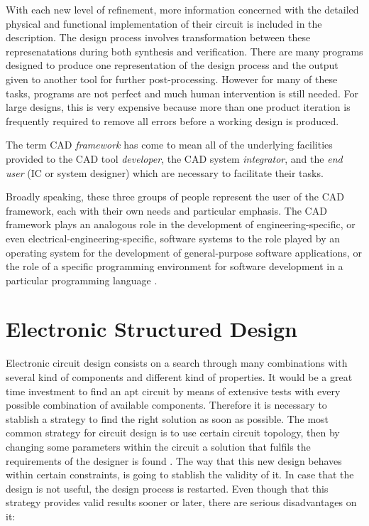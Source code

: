\documentclass[twocolumn]{IEEEtran}
\begin{document}
With each new level of refinement, more information concerned with the detailed physical and functional implementation of their circuit is included in the description. The design process involves transformation between these represenatations during both synthesis and verification. There are many programs designed to produce one representation of the design process and the output given to another tool for further post-processing. However for many of these tasks, programs are not perfect and much human intervention is still needed. For large designs, this is very expensive because more than one product iteration is frequently required to remove all errors before a working design is produced.

The term CAD {\it framework} has come to mean all of the underlying facilities provided to the CAD tool {\it developer}, the CAD system {\it integrator}, and the {\it end user} (IC or system designer) which are necessary to facilitate their tasks.

Broadly speaking, these three groups of people represent the user of the CAD framework, each with their own needs and particular emphasis. The CAD framework plays an analogous role in the development of engineering-specific, or even electrical-engineering-specific, software systems to the role played by an operating system for the development of general-purpose software applications, or the role of a specific programming environment for software development in a particular programming language \cite{barnes}. 
\section{Electronic Structured Design}
Electronic circuit design consists on a search through many combinations with several kind of components and different kind of properties. It would be a great time investment to find an apt circuit by means of extensive tests with every possible combination of available components. Therefore it is necessary to stablish a strategy to find the right solution as soon as possible. The most common strategy for circuit design is to use certain circuit topology, then by changing some parameters within the circuit a solution that fulfils the requirements of the designer is found \cite{verhoeven}. The way that this new design behaves within certain constraints, is going to stablish the validity of it. In case that the design is not useful, the design process is restarted. Even though that this strategy provides valid results sooner or later, there are serious disadvantages on it:
\end{document}
